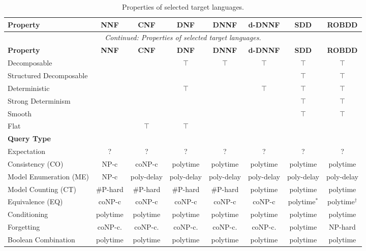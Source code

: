 \begin{landscape}
\begin{longtable}{@{}lccccccc@{}}
\caption{Properties of selected target languages.}%
\label{tbl:kc_language_properties}\\
\toprule
\textbf{Property} & \textbf{NNF} & \textbf{CNF} & \textbf{DNF} & \textbf{DNNF} & \textbf{d-DNNF} & \textbf{SDD} & \textbf{ROBDD} \\
\midrule
\endfirsthead

\multicolumn{8}{c}{\textit{Continued: Properties of selected target languages.}}\\
\toprule
\textbf{Property} & \textbf{NNF} & \textbf{CNF} & \textbf{DNF} & \textbf{DNNF} & \textbf{d-DNNF} & \textbf{SDD} & \textbf{ROBDD} \\
\midrule
\endhead

\endfoot
\bottomrule
\endlastfoot

Decomposable                &  &  & $\top$ & $\top$ & $\top$ & $\top$ & $\top$ \\
Structured Decomposable  &  &  &  &  &  & $\top$ & $\top$ \\
Deterministic               &  &  & $\top$ &  & $\top$ & $\top$ & $\top$ 
\\
Strong Determinism          &  &  &  &  &  & $\top$ & $\top$ \\
Smooth                      &  &  &  &  &  & $\top$ & $\top$ \\
Flat                        &  & $\top$ & $\top$ &  &  &  &  \\
\midrule
\textbf{Query Type} & & & & & & & \\
\midrule
Expectation           & ? & ? & ? & ? & ? & ? & ? \\
Consistency (CO)            & NP-c & coNP-c & polytime & polytime & polytime & polytime & polytime \\
Model Enumeration (ME)      & NP-c & poly-delay & poly-delay & poly-delay & poly-delay & poly-delay & poly-delay \\
Model Counting (CT)         & \#P-hard & \#P-hard & \#P-hard & \#P-hard & polytime & polytime & polytime \\
Equivalence (EQ)            & coNP-c & coNP-c & coNP-c & coNP-c & coNP-c & polytime$^*$ & polytime$^\dagger$ \\
Conditioning                & polytime & polytime & polytime & polytime & polytime & polytime & polytime \\
Forgetting                  & coNP-c. & coNP-c. & coNP-c. & coNP-c. & coNP-c. & polytime & NP-hard \\
Boolean Combination         & polytime & polytime & polytime & polytime & polytime & polytime & polytime \\
\end{longtable}
\end{landscape}

